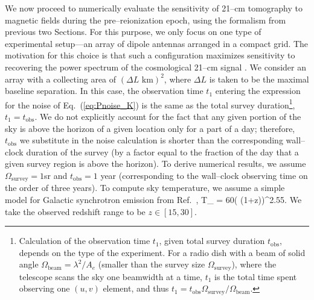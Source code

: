 We now proceed to numerically evaluate the sensitivity of 21--cm tomography to magnetic fields during the pre--reionization epoch, using the formalism from previous two Sections. For this purpose, we only focus on one type of experimental setup---an array of dipole antennas arranged in a compact grid. The motivation for this choice is that such a configuration maximizes sensitivity to recovering the power spectrum of the cosmological 21--cm signal \cite{2009PhRvD..79h3530T,2015AAS...22532803D}. We consider an array with a collecting area of $(\Delta L\text{ km})^2$, where $\Delta L$ is taken to be the maximal baseline separation. In this case, the observation time $t_1$ entering the expression for the noise of Eq.~(\ref{eq:Pnoise_K}) is the same as the total survey duration\footnote{Calculation of the observation time $t_1$, given total survey duration $t_\text{obs}$, depends on the type of the experiment. For a radio dish with a beam of solid angle $\Omega_\text{beam}=\lambda^2/A_e$ (smaller than the survey size $\Omega_\text{survey}$), where the telescope scans the sky one beamwidth at a time, $t_1$ is the total time spent observing one $(u,v)$ element, and thus $t_1=t_\text{obs}\Omega_\text{survey}/\Omega_\text{beam}$.}, $t_1=t_\text{obs}$. We do not explicitly account for the fact that any given portion of the sky is above the horizon of a given location only for a part of a day; therefore, $t_\text{obs}$ we substitute in the noise calculation is shorter than the corresponding wall--clock duration of the survey (by a factor equal to the fraction of the day that a given survey region is above the horizon). To derive numerical results, we assume $\Omega_\text{survey}=1$sr and $t_\text{obs}=1$ year (corresponding to the wall--clock observing time on the order of three years). To compute sky temperature, we assume a simple model for Galactic synchrotron emission from Ref.~\cite{2008PhRvD..78b3529M}, 
\beq
T_  = 60\left( (1+z)\right)^{2.55}\text{   [K]}.
\label{eq:tsys}
\eeq
We take the observed redshift range to be $z\in[15,30]$. 

